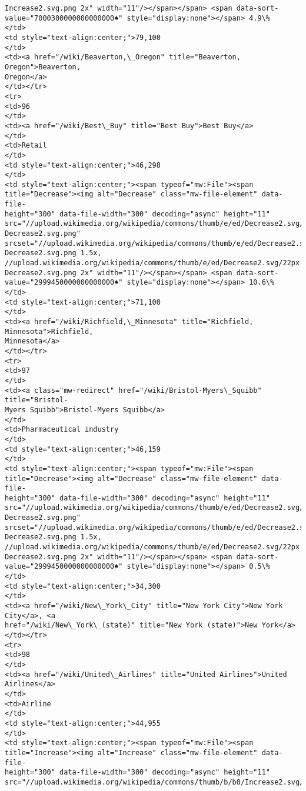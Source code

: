 \documentclass[11pt]{article}
\begin{document}
\begin{Verbatim}[commandchars=\\\{\}]
Increase2.svg.png 2x" width="11"/></span></span> <span data-sort-
value="7000300000000000000♠" style="display:none"></span> 4.9\%
</td>
<td style="text-align:center;">79,100
</td>
<td><a href="/wiki/Beaverton,\_Oregon" title="Beaverton, Oregon">Beaverton,
Oregon</a>
</td></tr>
<tr>
<td>96
</td>
<td><a href="/wiki/Best\_Buy" title="Best Buy">Best Buy</a>
</td>
<td>Retail
</td>
<td style="text-align:center;">46,298
</td>
<td style="text-align:center;"><span typeof="mw:File"><span
title="Decrease"><img alt="Decrease" class="mw-file-element" data-file-
height="300" data-file-width="300" decoding="async" height="11"
src="//upload.wikimedia.org/wikipedia/commons/thumb/e/ed/Decrease2.svg/11px-
Decrease2.svg.png"
srcset="//upload.wikimedia.org/wikipedia/commons/thumb/e/ed/Decrease2.svg/17px-
Decrease2.svg.png 1.5x,
//upload.wikimedia.org/wikipedia/commons/thumb/e/ed/Decrease2.svg/22px-
Decrease2.svg.png 2x" width="11"/></span></span> <span data-sort-
value="2999450000000000000♠" style="display:none"></span> 10.6\%
</td>
<td style="text-align:center;">71,100
</td>
<td><a href="/wiki/Richfield,\_Minnesota" title="Richfield, Minnesota">Richfield,
Minnesota</a>
</td></tr>
<tr>
<td>97
</td>
<td><a class="mw-redirect" href="/wiki/Bristol-Myers\_Squibb" title="Bristol-
Myers Squibb">Bristol-Myers Squibb</a>
</td>
<td>Pharmaceutical industry
</td>
<td style="text-align:center;">46,159
</td>
<td style="text-align:center;"><span typeof="mw:File"><span
title="Decrease"><img alt="Decrease" class="mw-file-element" data-file-
height="300" data-file-width="300" decoding="async" height="11"
src="//upload.wikimedia.org/wikipedia/commons/thumb/e/ed/Decrease2.svg/11px-
Decrease2.svg.png"
srcset="//upload.wikimedia.org/wikipedia/commons/thumb/e/ed/Decrease2.svg/17px-
Decrease2.svg.png 1.5x,
//upload.wikimedia.org/wikipedia/commons/thumb/e/ed/Decrease2.svg/22px-
Decrease2.svg.png 2x" width="11"/></span></span> <span data-sort-
value="2999450000000000000♠" style="display:none"></span> 0.5\%
</td>
<td style="text-align:center;">34,300
</td>
<td><a href="/wiki/New\_York\_City" title="New York City">New York City</a>, <a
href="/wiki/New\_York\_(state)" title="New York (state)">New York</a>
</td></tr>
<tr>
<td>98
</td>
<td><a href="/wiki/United\_Airlines" title="United Airlines">United Airlines</a>
</td>
<td>Airline
</td>
<td style="text-align:center;">44,955
</td>
<td style="text-align:center;"><span typeof="mw:File"><span
title="Increase"><img alt="Increase" class="mw-file-element" data-file-
height="300" data-file-width="300" decoding="async" height="11"
src="//upload.wikimedia.org/wikipedia/commons/thumb/b/b0/Increase2.svg/11px-

\end{Verbatim}
\end{document}
